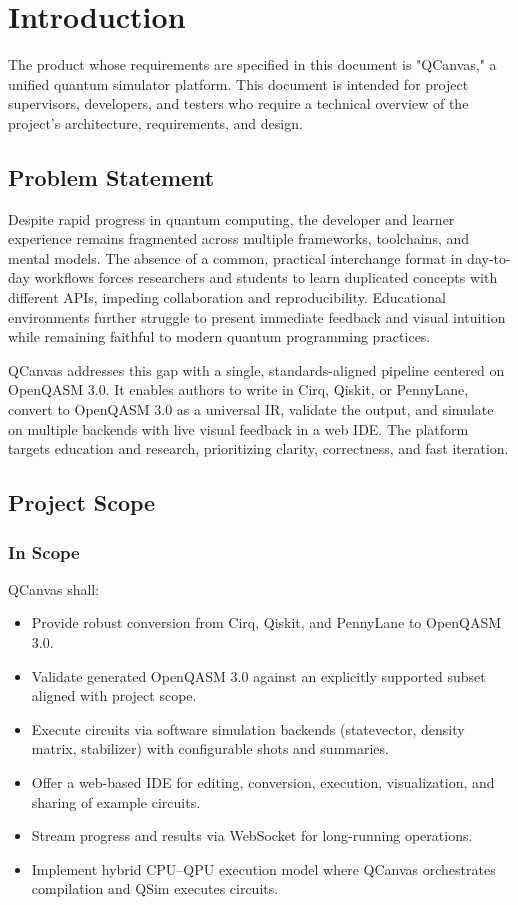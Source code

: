 \chapter{Introduction}

The product whose requirements are specified in this document is "QCanvas," a unified quantum simulator platform. This document is intended for project supervisors, developers, and testers who require a technical overview of the project's architecture, requirements, and design.

\section{Problem Statement}

Despite rapid progress in quantum computing, the developer and learner experience remains fragmented across multiple frameworks, toolchains, and mental models. The absence of a common, practical interchange format in day-to-day workflows forces researchers and students to learn duplicated concepts with different APIs, impeding collaboration and reproducibility. Educational environments further struggle to present immediate feedback and visual intuition while remaining faithful to modern quantum programming practices.

QCanvas addresses this gap with a single, standards-aligned pipeline centered on OpenQASM 3.0. It enables authors to write in Cirq, Qiskit, or PennyLane, convert to OpenQASM 3.0 as a universal IR, validate the output, and simulate on multiple backends with live visual feedback in a web IDE. The platform targets education and research, prioritizing clarity, correctness, and fast iteration.

\clearpage

\section{Project Scope}

\subsection{In Scope}

QCanvas shall:
\begin{itemize}
    \item Provide robust conversion from Cirq, Qiskit, and PennyLane to OpenQASM 3.0.
    \item Validate generated OpenQASM 3.0 against an explicitly supported subset aligned with project scope.
    \item Execute circuits via software simulation backends (statevector, density matrix, stabilizer) with configurable shots and summaries.
    \item Offer a web-based IDE for editing, conversion, execution, visualization, and sharing of example circuits.
    \item Stream progress and results via WebSocket for long-running operations.
    \item Implement hybrid CPU–QPU execution model where QCanvas orchestrates compilation and QSim executes circuits.
\end{itemize}

